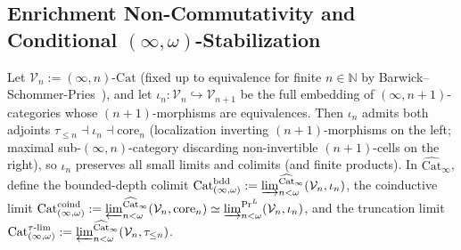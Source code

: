 \documentclass[11pt]{article}
\theoremstyle{plain}
\theoremstyle{definition}
\newcommand{\Cat}{\mathrm{Cat}}
\begin{document}
\subsection{Enrichment Non-Commutativity and Conditional \texorpdfstring{$(\infty, \omega)$}{(infinity, omega)}-Stabilization}

Let $\mathcal{V}_n := (\infty, n)\text{-}\Cat$ (fixed up to equivalence for finite $n \in \mathbb{N}$ by Barwick--Schommer-Pries~\cite{BarwickSchommerPries2021}), and let $\iota_n : \mathcal{V}_n \hookrightarrow \mathcal{V}_{n+1}$ be the full embedding of $(\infty, n+1)$-categories whose $(n+1)$-morphisms are equivalences. Then $\iota_n$ admits both adjoints $\tau_{\le n} \dashv \iota_n \dashv \mathrm{core}_n$ (localization inverting $(n+1)$-morphisms on the left; maximal sub-$(\infty, n)$-category discarding non-invertible $(n+1)$-cells on the right), so $\iota_n$ preserves all small limits and colimits (and finite products). In $\widehat{\Cat}_\infty$, define the bounded-depth colimit $\Cat_{(\infty,\omega)}^{\mathrm{bdd}} := \varinjlim_{n < \omega}^{\widehat{\Cat}_\infty} (\mathcal{V}_n, \iota_n)$, the coinductive limit $\Cat_{(\infty,\omega)}^{\mathrm{coind}} := \varprojlim_{n < \omega}^{\widehat{\Cat}_\infty} (\mathcal{V}_n, \mathrm{core}_n) \simeq \varinjlim_{n < \omega}^{\mathrm{Pr}^L} (\mathcal{V}_n, \iota_n)$, and the truncation limit $\Cat_{(\infty,\omega)}^{\tau\text{-}\mathrm{lim}} := \varprojlim_{n < \omega}^{\widehat{\Cat}_\infty} (\mathcal{V}_n, \tau_{\le n})$.
\end{document}
